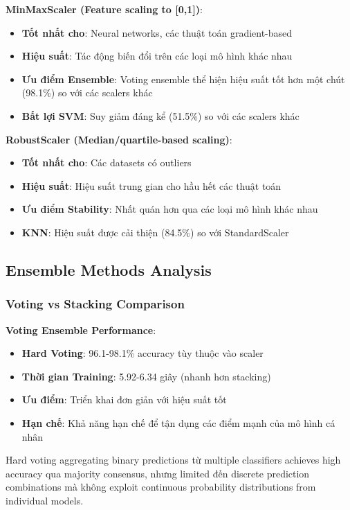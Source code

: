\textbf{MinMaxScaler (Feature scaling to [0,1])}:
\begin{itemize}
    \item \textbf{Tốt nhất cho}: Neural networks, các thuật toán gradient-based
    \item \textbf{Hiệu suất}: Tác động biến đổi trên các loại mô hình khác nhau
    \item \textbf{Ưu điểm Ensemble}: Voting ensemble thể hiện hiệu suất tốt hơn một chút (98.1\%) so với các scalers khác
    \item \textbf{Bất lợi SVM}: Suy giảm đáng kể (51.5\%) so với các scalers khác
\end{itemize}

\textbf{RobustScaler (Median/quartile-based scaling)}:
\begin{itemize}
    \item \textbf{Tốt nhất cho}: Các datasets có outliers
    \item \textbf{Hiệu suất}: Hiệu suất trung gian cho hầu hết các thuật toán
    \item \textbf{Ưu điểm Stability}: Nhất quán hơn qua các loại mô hình khác nhau
    \item \textbf{KNN}: Hiệu suất được cải thiện (84.5\%) so với StandardScaler
\end{itemize}

\subsection{Ensemble Methods Analysis}\label{subsec:detailed-ensemble-analysis}

\subsubsection{Voting vs Stacking Comparison}

\textbf{Voting Ensemble Performance}:
\begin{itemize}
    \item \textbf{Hard Voting}: 96.1-98.1\% accuracy tùy thuộc vào scaler
    \item \textbf{Thời gian Training}: 5.92-6.34 giây (nhanh hơn stacking)
    \item \textbf{Ưu điểm}: Triển khai đơn giản với hiệu suất tốt
    \item \textbf{Hạn chế}: Khả năng hạn chế để tận dụng các điểm mạnh của mô hình cá nhân
\end{itemize}
Hard voting aggregating binary predictions từ multiple classifiers achieves high accuracy qua majority consensus, nhưng limited đến discrete prediction combinations mà không exploit continuous probability distributions from individual models.

